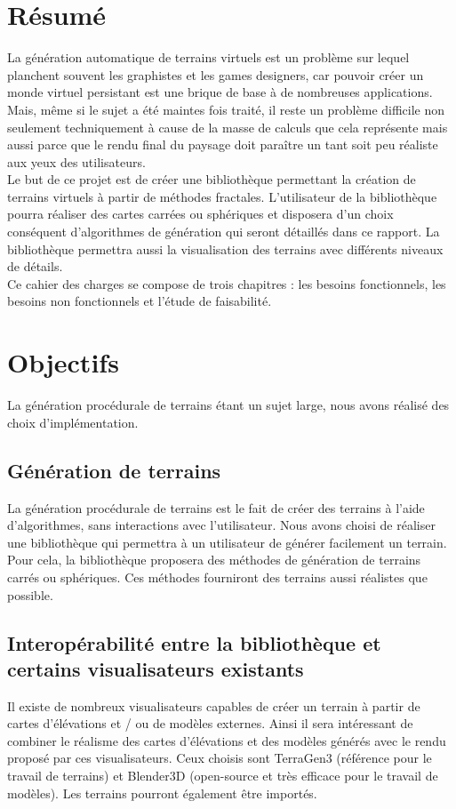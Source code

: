 \chapter*{Résumé}
La génération automatique de terrains virtuels est un problème sur lequel
planchent souvent les graphistes et les games designers, car pouvoir créer
 un monde virtuel persistant est une brique de base à de nombreuses
applications. Mais, même si le sujet a été maintes fois traité, il reste un
problème difficile non seulement techniquement à cause de la masse de calculs
 que cela représente mais aussi parce que le rendu final du paysage doit
paraître un tant soit peu réaliste aux yeux des utilisateurs.\\

Le but de ce projet est de créer une bibliothèque permettant la création de
terrains virtuels à partir de méthodes fractales. L'utilisateur de la bibliothèque
pourra réaliser des cartes carrées ou sphériques et disposera d'un choix
conséquent d'algorithmes de génération qui seront détaillés dans ce rapport.
La bibliothèque permettra aussi la visualisation des terrains avec différents
niveaux de détails.\\

Ce cahier des charges se compose de trois chapitres : les besoins fonctionnels, les besoins non fonctionnels et l'étude de faisabilité.

\chapter*{Objectifs}
La génération procédurale de terrains étant un sujet large, nous avons réalisé des choix d'implémentation.

\section*{Génération de terrains}
La génération procédurale de terrains est le fait de créer des terrains à l'aide d'algorithmes, sans interactions avec l'utilisateur. Nous avons choisi de réaliser une bibliothèque qui permettra à un utilisateur de générer facilement un terrain. Pour cela, la bibliothèque proposera des méthodes de génération de terrains carrés ou sphériques. Ces méthodes fourniront des terrains aussi réalistes que possible.

\section*{Interopérabilité entre la bibliothèque et certains visualisateurs existants}
Il existe de nombreux visualisateurs capables de créer un terrain à partir de cartes d'élévations et / ou de modèles externes.
Ainsi il sera intéressant de combiner le réalisme des cartes d'élévations et des modèles générés avec le rendu proposé par ces visualisateurs. Ceux choisis sont TerraGen3 (référence pour le travail de terrains) et Blender3D (open-source et très efficace pour le travail de modèles). Les terrains pourront également être importés.

